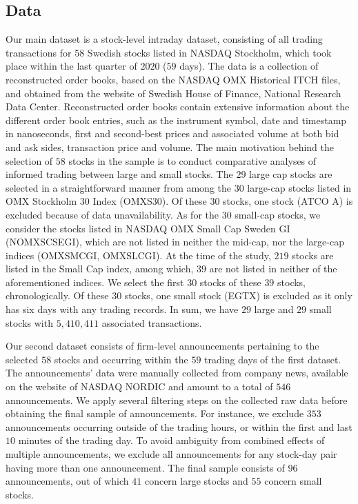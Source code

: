 \subsection{Data}

Our main dataset is a stock-level intraday dataset, consisting of all trading transactions for \( 58\) Swedish stocks listed in NASDAQ Stockholm, which took place within the last quarter of \(2020\) (\( 59\) days). The data is a collection of reconstructed order books, based on the NASDAQ OMX Historical ITCH files, and obtained from the website of Swedish House of Finance, National Research Data Center. Reconstructed order books contain extensive information about the different order book entries, such as the instrument symbol, date and timestamp in nanoseconds, first and second-best prices and associated volume at both bid and ask sides, transaction price and volume. The main motivation behind the selection of \(58\) stocks in the sample is to conduct comparative analyses of informed trading between large and small stocks. The $29$ large cap stocks are selected in a straightforward manner from among the \(30\) large-cap stocks listed in OMX Stockholm \(30\) Index (OMXS30). Of these \( 30\) stocks, one stock (ATCO A) is excluded because of data unavailability.  As for the 30 small-cap stocks, we consider the stocks listed in NASDAQ OMX Small Cap Sweden GI (NOMXSCSEGI), which are not listed in neither the mid-cap, nor the large-cap indices (OMXSMCGI, OMXSLCGI). At the time of the study, \(219\) stocks are listed in the Small Cap index, among which, \(39\) are not listed in neither of the aforementioned indices. We select the first \(30\) stocks of these \(39\) stocks, chronologically. Of these \(30\) stocks, one small stock (EGTX) is excluded as it only has six days with any trading records. In sum, we have \(29\) large and \(29\) small stocks with \(5,410,411\) associated transactions. 

Our second dataset consists of firm-level announcements pertaining to the selected \(58\) stocks and occurring within the \(59\) trading days of the first dataset. The announcements’ data were manually collected from company news, available on the website of NASDAQ NORDIC and amount to a total of \(546\) announcements. We apply several filtering steps on the collected raw data before obtaining the final sample of announcements. 
For instance, we exclude \(353\) announcements occurring outside of the trading hours, or within the first and last \(10\) minutes of the trading day. To avoid ambiguity  from combined effects of multiple announcements, we exclude all announcements for any stock-day pair having more than one announcement. The final sample consists of \( 96\) announcements, out of which $41$ concern large stocks and $55$ concern small stocks.

